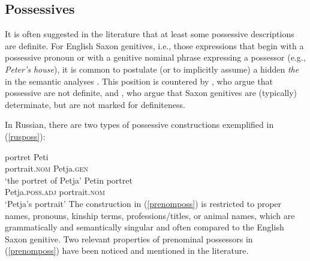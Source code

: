 \documentclass[output=paper,colorlinks,citecolor=brown]{langscibook}
\begin{document}

					
	 

\subsection{Possessives} \label{possessives}

It is often suggested in the literature that at least some possessive descriptions are definite. For English Saxon genitives, i.e., those expressions that begin with a possessive pronoun or with a genitive nominal phrase expressing a possessor (e.g., \textit{Peter's house}), it is common to postulate (or to implicitly assume) a hidden \textit{the} in the semantic analyses \citep[cf.][]{parteeborschev03, viknerjensen02}. This position is countered by \citet{peterswesterstahl13}, who argue that possessive are not definite, and \citet{coppockbeaver15}, who argue that Saxon genitives are (typically) determinate, but are not marked for definiteness. 

In Russian, there are two types of possessive constructions exemplified in (\ref{rusposs}): 

\ea \label{rusposs} 
\ea \gll 	portret 				Peti \label{postnomposs}\\
		portrait.\textsc{nom} 	Petja.\textsc{gen} \\
        \glt `the portret of Petja'
\ex \gll 	Petin 	portret \label{prenomposs}\\ 
		Petja.\textsc{poss.adj} 	portrait.\textsc{nom} \\
\glt `Petja's portrait'
\z
\z
\noindent The construction in (\ref{prenomposs}) is restricted to proper names, pronouns, kinship terms, professions/titles, or animal names, which are grammatically and semantically singular \citep{babyonyshev97} and often compared to the English Saxon genitive. Two relevant properties of prenominal possessors in (\ref{prenomposs}) have been noticed and mentioned in the literature. 
\end{document}
